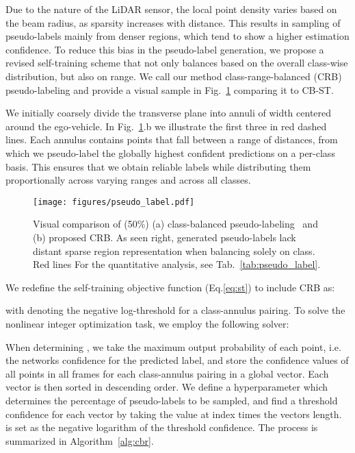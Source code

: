 \documentclass[10pt,twocolumn,letterpaper]{article}
\begin{document}
Due to the nature of the LiDAR sensor, the local point density varies based on the beam radius, as sparsity increases with distance. This results in sampling of pseudo-labels mainly from denser regions, which tend to show a higher estimation confidence. To reduce this bias in the pseudo-label generation, we propose a revised self-training scheme that not only balances based on the overall class-wise distribution, but also on range. We call our method class-range-balanced (CRB) pseudo-labeling and provide a visual sample in Fig.~\ref{fig:pseudo_label} comparing it to CB-ST.

We initially coarsely divide the transverse plane into  annuli of width  centered around the ego-vehicle. In Fig.~\ref{fig:pseudo_label}.b we illustrate the first three in red dashed lines. Each annulus contains points that fall between a range of distances, from which we pseudo-label the globally highest confident predictions on a per-class basis. This ensures that we obtain reliable labels while distributing them proportionally across varying ranges and across all classes.

\begin{figure}[t]
    \centering
    \texttt{[image: figures/pseudo\_label.pdf]}
    \caption{Visual comparison of (50\%) (a) class-balanced pseudo-labeling~\cite{eccv2018classbalanced} and (b) proposed CRB. As seen right, generated pseudo-labels lack distant sparse region representation when balancing solely on class. Red lines For the quantitative analysis, see Tab.~\ref{tab:pseudo_label}.
    \label{fig:pseudo_label}}
\end{figure}

We redefine the self-training objective function (Eq.\ref{eq:st}) to include CRB as:

with  denoting the negative log-threshold for a class-annulus pairing. To solve the nonlinear integer optimization task, we employ the following solver:


When determining , we take the maximum output probability of each point, i.e. the networks confidence for the predicted label, and store the confidence values of all points in all frames for each class-annulus pairing in a global vector. Each vector is then sorted in descending order. We define a hyperparameter  which determines the percentage of pseudo-labels to be sampled, and find a threshold confidence for each vector by taking the value at index  times the vectors length.  is set as the negative logarithm of the threshold confidence. The process is summarized in Algorithm~\ref{alg:cbr}.
\end{document}
